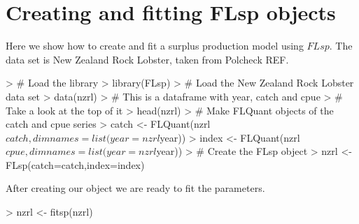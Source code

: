 \documentclass[a4paper]{article}
\begin{document}
\section{Creating and fitting FLsp objects}

Here we show how to create and fit a surplus production model using $FLsp$. The data set is New Zealand Rock Lobster, taken from Polcheck REF.

\begin{center}
\begin{minipage}[H]{0.95\textwidth}%
\begin{shaded}%
\begin{Schunk}
\begin{Sinput}
> # Load the library
> library(FLsp)
> # Load the New Zealand Rock Lobster data set
> data(nzrl)
> # This is a dataframe with year, catch and cpue
> # Take a look at the top of it
> head(nzrl)
> # Make FLQuant objects of the catch and cpue series
> catch <- FLQuant(nzrl$catch, dimnames=list(year=nzrl$year))
> index <- FLQuant(nzrl$cpue, dimnames=list(year=nzrl$year))
> # Create the FLsp object
> nzrl <- FLsp(catch=catch,index=index)
\end{Sinput}
\end{Schunk}
\end{shaded}%
\end{minipage}
\end{center}

After creating our object we are ready to fit the parameters.

\begin{center}
\begin{minipage}[H]{0.95\textwidth}%
\begin{shaded}%
\begin{Schunk}
\begin{Sinput}
> nzrl <- fitsp(nzrl)
\end{Sinput}
\end{Schunk}
\end{shaded}%
\end{minipage}
\end{center}
\end{document}
